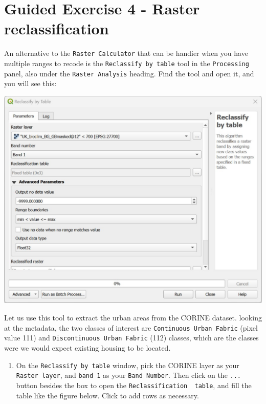 \documentclass[
  letterpaper,
  DIV=11,
  numbers=noendperiod]{scrreprt}
\providecommand{\tightlist}{%
  \setlength{\itemsep}{0pt}\setlength{\parskip}{0pt}}\usepackage{longtable,booktabs,array}
\begin{document}
\section{Guided Exercise 4 - Raster
reclassification}\label{guided-exercise-4---raster-reclassification}

An alternative to the \texttt{Raster\ Calculator} that can be handier
when you have multiple ranges to recode is the
\texttt{Reclassify\ by\ table} tool in the \texttt{Processing} panel,
also under the \texttt{Raster\ Analysis} heading. Find the tool and open
it, and you will see this:

\includegraphics{images/lab_6/lab_6_fig4_rec_by_table.jpg}

Let us use this tool to extract the urban areas from the CORINE dataset.
looking at the metadata, the two classes of interest are
\texttt{Continuous\ Urban\ Fabric} (pixel value 111) and
\texttt{Discontinuous\ Urban\ Fabric} (112) classes, which are the
classes were we would expect existing housing to be located.

\begin{enumerate}
\def\labelenumi{(\arabic{enumi})}
\setcounter{enumi}{169}
\tightlist
\item
  On the \texttt{Reclassify\ by\ table} window, pick the CORINE layer as
  your \texttt{Raster\ layer}, and \texttt{band\ 1} as your
  \texttt{Band\ Number}. Then click on the \texttt{...} button besides
  the box to open the \texttt{Reclassification\ \ table}, and fill the
  table like the figure below. Click to add rows as necessary.
\end{enumerate}
\end{document}

